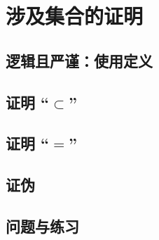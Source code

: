 \section{涉及集合的证明}

\subsection{逻辑且严谨：使用定义}

\subsection{证明 ``$\subset$''}

\subsection{证明 ``$=$''}

\subsection{证伪}

\subsection{问题与练习}
